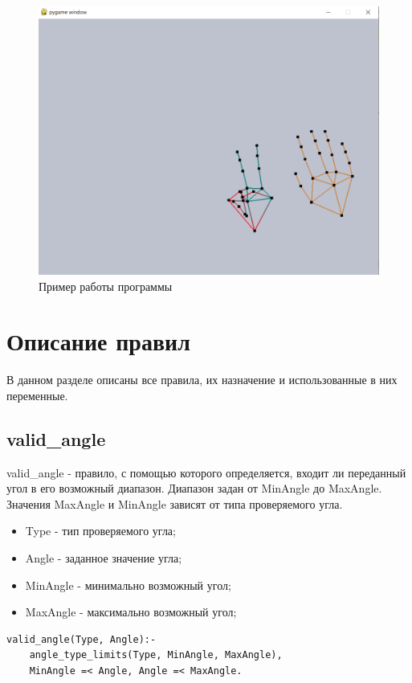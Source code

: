 \begin{figure}[ht!]
	\centering
	\includegraphics[scale=0.65]{example.png}
	\caption{Пример работы программы}
	\label{fig:example}
\end{figure}

\section{Описание правил}
\hspace{0.6cm}В данном разделе описаны все правила, их назначение и использованные в них переменные.

\subsection{valid\_angle}
\hspace{0.6cm} valid\_angle - правило, с помощью которого определяется, входит ли переданный угол в его возможный диапазон. Диапазон задан от MinAngle до MaxAngle. Значения MaxAngle и MinAngle зависят от типа проверяемого угла.

\begin{itemize}
	\item Type - тип проверяемого угла;
	\item Angle - заданное значение угла;
	\item MinAngle - минимально возможный угол;
	\item MaxAngle - максимально возможный угол;
\end{itemize}

\begin{lstlisting}[caption=Реализация правила valid\_angle, label=rules:validangle]
valid_angle(Type, Angle):-
	angle_type_limits(Type, MinAngle, MaxAngle),
	MinAngle =< Angle, Angle =< MaxAngle.
\end{lstlisting}


